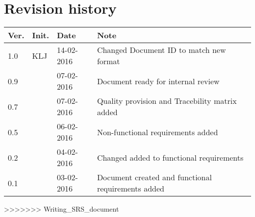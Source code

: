 \label{chp_revisionHistory}
\chapter{Revision history}

\begin{tabular}{b{1cm} b{1cm} b{2cm} b{8cm}}
    \textbf{Ver.} & \textbf{Init.} & \textbf{Date} & \textbf{Note} \\
    \hline
    1.0 & KLJ & 14-02-2016 & Changed Document ID to match new format \\
    0.9 &  & 07-02-2016 & Document ready for internal review \\
    0.7 &  & 07-02-2016 & Quality provision and Tracebility matrix added \\
    0.5 &  & 06-02-2016 & Non-functional requirements added \\
	0.2 &  & 04-02-2016 & Changed added to functional requirements \\
    0.1 &  & 03-02-2016 & Document created and functional requirements added  \\
\end{tabular}
>>>>>>> Writing_SRS_document

